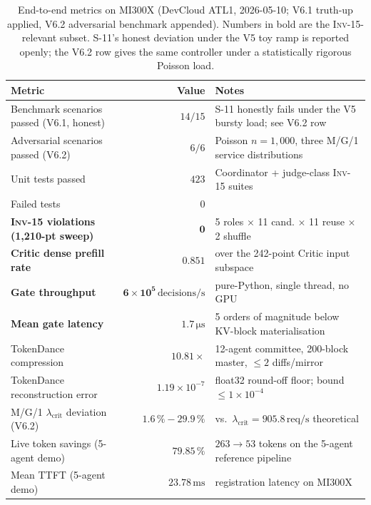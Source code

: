 \documentclass[10pt,twocolumn]{article}
\newcommand{\INV}[1]{\textsc{Inv-#1}}
\begin{document}
\begin{table}[t]
  \centering
  \footnotesize
  \caption{End-to-end metrics on MI300X (DevCloud ATL1, 2026-05-10;
           V6.1 truth-up applied, V6.2 adversarial benchmark
           appended). Numbers in bold are the \INV{15}-relevant
           subset. S-11's honest deviation under the V5 toy ramp is
           reported openly; the V6.2 row gives the same controller
           under a statistically rigorous Poisson load.}
  \label{tab:e2e}
  \begin{tabular}{@{}lrl@{}}
    \toprule
    Metric & Value & Notes \\
    \midrule
    Benchmark scenarios passed (V6.1, honest)
        & $14 / 15$
        & S-11 honestly fails under the V5 bursty load; see V6.2 row \\
    Adversarial scenarios passed (V6.2)
        & $6 / 6$
        & Poisson $n{=}1{,}000$, three M/G/1 service distributions \\
    Unit tests passed
        & $423$
        & Coordinator + judge-class \INV{15} suites \\
    Failed tests
        & $0$
        & \\
    \midrule
    \textbf{\INV{15} violations (1{,}210-pt sweep)}
        & $\mathbf{0}$
        & 5 roles $\times$ 11 cand. $\times$ 11 reuse $\times$ 2 shuffle \\
    \textbf{Critic dense prefill rate}
        & $\mathbf{0.851}$
        & over the 242-point Critic input subspace \\
    \textbf{Gate throughput}
        & $\mathbf{6\!\times\!10^{5}\,\mathrm{decisions/s}}$
        & pure-Python, single thread, no GPU \\
    \textbf{Mean gate latency}
        & $\mathbf{1.7\,\mathrm{\mu s}}$
        & 5 orders of magnitude below KV-block materialisation \\
    \midrule
    TokenDance compression
        & $10.81\times$
        & 12-agent committee, 200-block master, $\leq 2$ diffs/mirror \\
    TokenDance reconstruction error
        & $1.19\times10^{-7}$
        & float32 round-off floor; bound $\leq 1\times10^{-4}$ \\
    M/G/1 $\lambda_{\text{crit}}$ deviation (V6.2)
        & $1.6\,\%\!-\!29.9\,\%$
        & vs.\ $\lambda_{\text{crit}}\!=\!905.8\,\mathrm{req/s}$ theoretical \\
    Live token savings (5-agent demo)
        & $79.85\,\%$
        & $263 \to 53$ tokens on the 5-agent reference pipeline \\
    Mean TTFT (5-agent demo)
        & $23.78\,\mathrm{ms}$
        & registration latency on MI300X \\
    \bottomrule
  \end{tabular}
\end{table}
\end{document}
